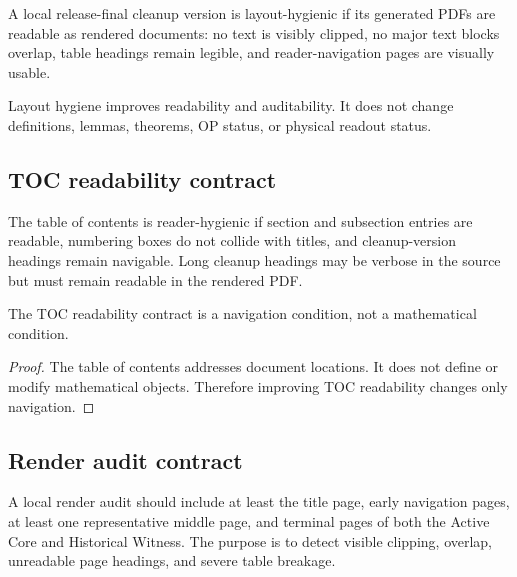 \begin{definition}
\label{def:v4012-layout-hygiene-principle}
A local release-final cleanup version is layout-hygienic if its generated PDFs are readable
as rendered documents: no text is visibly clipped, no major text blocks overlap,
table headings remain legible, and reader-navigation pages are visually usable.
\end{definition}

\begin{remark}
\label{rem:v4012-layout-not-theorematic-content}
Layout hygiene improves readability and auditability. It does not change
definitions, lemmas, theorems, OP status, or physical readout status.
\end{remark}

\subsection{TOC readability contract}
\label{subsec:v4012-toc-readability-contract}

\begin{definition}
\label{def:v4012-toc-readability-contract}
The table of contents is reader-hygienic if section and subsection entries are
readable, numbering boxes do not collide with titles, and cleanup-version
headings remain navigable. Long cleanup headings may be verbose in the source
but must remain readable in the rendered PDF.
\end{definition}

\begin{lemma}
\label{lem:v4012-toc-readability-navigation-condition}
The TOC readability contract is a navigation condition, not a mathematical
condition.
\end{lemma}

\begin{proof}
The table of contents addresses document locations. It does not define or
modify mathematical objects. Therefore improving TOC readability changes only
navigation.
\end{proof}

\subsection{Render audit contract}
\label{subsec:v4012-render-audit-contract}

\begin{definition}
\label{def:v4012-render-audit-contract}
A local render audit should include at least the title page, early navigation
pages, at least one representative middle page, and terminal pages of both the
Active Core and Historical Witness. The purpose is to detect visible clipping,
overlap, unreadable page headings, and severe table breakage.
\end{definition}

